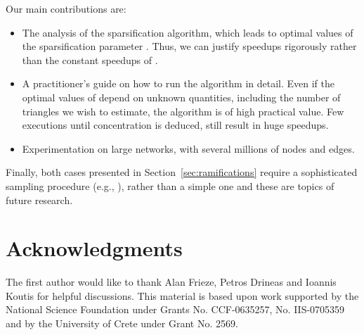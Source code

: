 \documentclass{llncs}
\begin{document}
Our main contributions are:
\begin{itemize}
\item The analysis of the sparsification algorithm, which leads to optimal values of the 
sparsification parameter . Thus, we can justify speedups rigorously rather than the constant speedups of  \cite{Tsourakakiskdd09}.
\item A practitioner's guide on how to run the algorithm in detail. Even if the optimal values
of  depend on unknown quantities, including the number of triangles we wish to estimate, 
the algorithm is of high practical value. Few executions until concentration is deduced, still result 
in huge speedups. 
\item Experimentation on large networks, with several millions of nodes and edges.
\end{itemize}

Finally, both cases presented in Section~\ref{sec:ramifications} require a sophisticated sampling procedure (e.g., \cite{spielman:spielman}), 
rather than a simple one and these are topics of future research. 

\section{Acknowledgments}
The first author would like to thank Alan Frieze, Petros Drineas and Ioannis Koutis for helpful discussions. 
This material is based upon work supported by the National Science Foundation under Grants No. CCF-0635257,
No. IIS-0705359 and by the University of Crete under Grant No. 2569.
\end{document}
